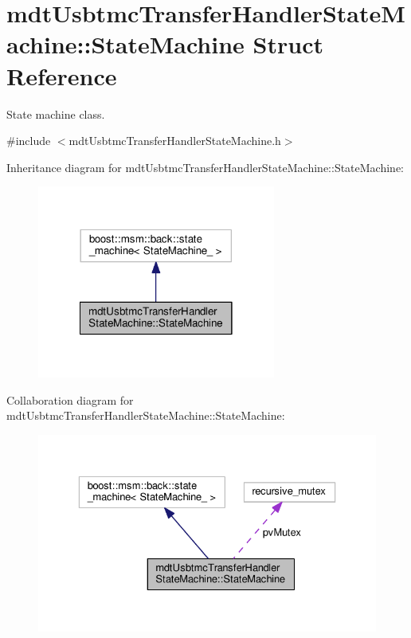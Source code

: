 \hypertarget{structmdt_usbtmc_transfer_handler_state_machine_1_1_state_machine}{\section{mdt\-Usbtmc\-Transfer\-Handler\-State\-Machine\-:\-:State\-Machine Struct Reference}
\label{structmdt_usbtmc_transfer_handler_state_machine_1_1_state_machine}
}


State machine class.  




{\ttfamily \#include $<$mdt\-Usbtmc\-Transfer\-Handler\-State\-Machine.\-h$>$}



Inheritance diagram for mdt\-Usbtmc\-Transfer\-Handler\-State\-Machine\-:\-:State\-Machine\-:
\nopagebreak
\begin{figure}[H]
\begin{center}
\leavevmode
\includegraphics[width=222pt]{structmdt_usbtmc_transfer_handler_state_machine_1_1_state_machine__inherit__graph}
\end{center}
\end{figure}


Collaboration diagram for mdt\-Usbtmc\-Transfer\-Handler\-State\-Machine\-:\-:State\-Machine\-:
\nopagebreak
\begin{figure}[H]
\begin{center}
\leavevmode
\includegraphics[width=329pt]{structmdt_usbtmc_transfer_handler_state_machine_1_1_state_machine__coll__graph}
\end{center}
\end{figure}
